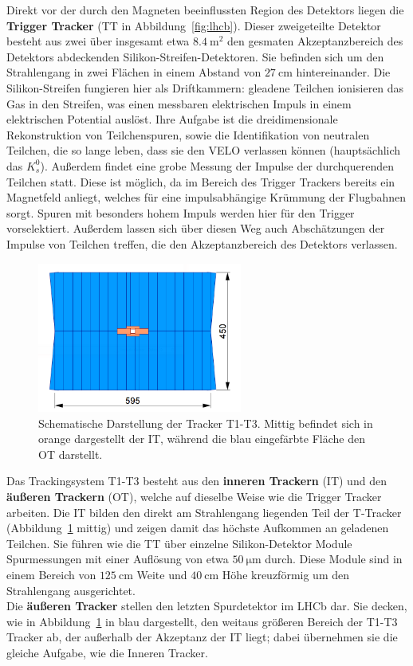 Direkt vor der durch den Magneten beeinflussten Region des Detektors liegen die \textbf{Trigger Tracker} (TT in Abbildung~\ref{fig:lhcb}). Dieser zweigeteilte Detektor besteht aus zwei über insgesamt etwa $\SI{8.4}{\meter\squared}$ den gesmaten Akzeptanzbereich des Detektors abdeckenden Silikon-Streifen-Detektoren\cite{lhcb}. Sie befinden sich um den Strahlengang in zwei Flächen in einem Abstand von $\SI{27}{\centi\meter}$ hintereinander. Die Silikon-Streifen fungieren hier als Driftkammern: gleadene Teilchen ionisieren das Gas in den Streifen, was einen messbaren elektrischen Impuls in einem elektrischen Potential auslöst. Ihre Aufgabe ist die dreidimensionale Rekonstruktion von Teilchenspuren, sowie die Identifikation von neutralen Teilchen, die so lange leben, dass sie den VELO verlassen können (hauptsächlich das $K_s^0$). Außerdem findet eine grobe Messung der Impulse der durchquerenden Teilchen statt. Diese ist möglich, da im Bereich des Trigger Trackers bereits ein Magnetfeld anliegt, welches für eine impulsabhängige Krümmung der Flugbahnen sorgt. Spuren mit besonders hohem Impuls werden hier für den Trigger vorselektiert. Außerdem lassen sich über diesen Weg auch Abschätzungen der Impulse von Teilchen treffen, die den Akzeptanzbereich des Detektors verlassen.\\

%
\begin{figure}[H]
  \centering
      \includegraphics[width=0.6\textwidth]{Plots/tracker.png}
  \caption{Schematische Darstellung der Tracker T1-T3. Mittig befindet sich in orange dargestellt der IT, während die blau eingefärbte Fläche den OT darstellt\cite{tracker}.}
  \label{fig:tracker}
\end{figure}
%
Das Trackingsystem T1-T3 besteht aus den \textbf{inneren Trackern} (IT) und den \textbf{äußeren Trackern} (OT), welche auf dieselbe Weise wie die Trigger Tracker arbeiten\cite{tracker}. Die IT bilden den direkt am Strahlengang liegenden Teil der T-Tracker (Abbildung~\ref{fig:tracker} mittig) und zeigen damit das höchste Aufkommen an geladenen Teilchen. Sie führen wie die TT über einzelne Silikon-Detektor Module Spurmessungen mit einer Auflösung von etwa $\SI{50}{\micro\meter}$ durch. Diese Module sind in einem Bereich von $\SI{125}{\centi\meter}$ Weite und $\SI{40}{\centi\meter}$ Höhe kreuzförmig um den Strahlengang ausgerichtet\cite{tracker}.\\
Die \textbf{äußeren Tracker} stellen den letzten Spurdetektor im LHCb dar. Sie decken, wie in Abbildung~\ref{fig:tracker} in blau dargestellt, den weitaus größeren Bereich der T1-T3 Tracker ab, der außerhalb der Akzeptanz der IT liegt; dabei übernehmen sie die gleiche Aufgabe, wie die Inneren Tracker.
